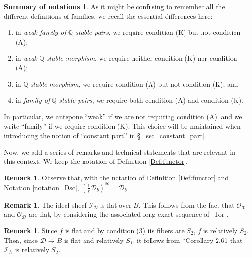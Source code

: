 \documentclass{amsart}
\newcommand{\bQ}{\mathbb{Q}}
\newcommand{\cD}{\mathcal{D}}
\newcommand{\cI}{\mathcal{I}}
\newcommand{\cX}{\mathcal{X}}
\theoremstyle{definition}
\newtheorem{Remark}[theorem]{Remark}
\def\O#1.{\mathcal {O}_{#1}}
\begin{document}
\newtheorem*{Summary_notation*}{Summary of notations}


\begin{Summary_notation*}
As it might be confusing to remember all the different definitions of families, we recall the essential differences here:
\begin{enumerate}
    \item in \textit{weak family of $\bQ$-stable pairs}, we require condition (K) but not condition (A);
    \item in \textit{weak} $\bQ$\textit{-stable morphism}, we require neither condition (K) nor condition (A);
    \item in $\bQ$\textit{-stable morphism}, we require condition (A) but not condition (K); and
    \item in \textit{family of} $\bQ$\textit{-stable pairs}, we require both condition (A) and condition (K).
\end{enumerate}
In particular, we antepone ``weak'' if we are not requiring condition (A), and we write ``family'' if we require condition (K).
This choice will be maintained when introducing the notion of ``constant part'' in \S~\ref{sec_constant_part}.
\end{Summary_notation*}



Now, we add a series of remarks and technical statements that are relevant in this context.
We keep the notation of Definition \ref{Def:functor}.
\begin{Remark}
Observe that, with the notation of Definition \ref{Def:functor} and Notation \ref{notation_Dsc}, $(\frac{1}{r}\cD_b)^{sc} = \cD_b$.
\end{Remark}
\begin{Remark} \label{remark_ideal_flat}
The ideal sheaf $\mathcal{I}_\cD$ is flat over $B$.
This follows from the fact that $\O \cX.$ and $\O \cD.$ are flat, by considering the associated long exact sequence of $\operatorname{Tor}$.
\end{Remark}

\begin{Remark}
Since $f$ is flat and by condition (3) its fibers are $S_2$, $f$ is relatively $S_2$.
Then, since $\cD\to B$ is flat and relatively $S_1$, it follows from \cite{Kol13}*{Corollary 2.61} that $\cI_\cD$ is relatively $S_2$.
\end{Remark}
\end{document}
